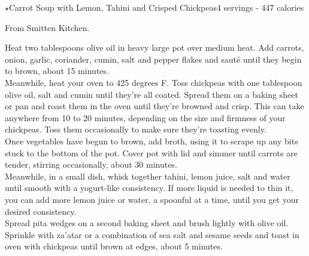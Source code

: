 \begin{recipe}{\texorpdfstring{$\star$}{str}Carrot Soup with Lemon, Tahini and Crisped Chickpeas}{4 servings - 447 calories}{}

\freeform From Smitten Kitchen.\\


Heat two tablespoons olive oil in heavy large pot over medium heat. Add carrots, onion, garlic, coriander, cumin, salt and pepper flakes and sauté until they begin to brown, about 15 minutes.\\

Meanwhile, heat your oven to 425 degrees F. Toss chickpeas with one tablespoon olive oil, salt and cumin until they’re all coated. Spread them on a baking sheet or pan and roast them in the oven until they’re browned and crisp. This can take anywhere from 10 to 20 minutes, depending on the size and firmness of your chickpeas. Toss them occasionally to make sure they’re toasting evenly.\\

Once vegetables have begun to brown, add broth, using it to scrape up any bits stuck to the bottom of the pot. Cover pot with lid and simmer until carrots are tender, stirring occasionally, about 30 minutes.\\

Meanwhile, in a small dish, whisk together tahini, lemon juice, salt and water until smooth with a yogurt-like consistency. If more liquid is needed to thin it, you can add more lemon juice or water, a spoonful at a time, until you get your desired consistency.\\

Spread pita wedges on a second baking sheet and brush lightly with olive oil. Sprinkle with za’atar or a combination of sea salt and sesame seeds and toast in oven with chickpeas until brown at edges, about 5 minutes.


\end{recipe}
